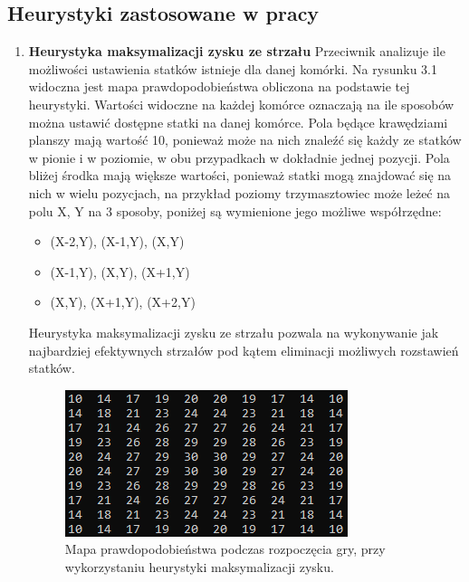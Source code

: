 \subsection{Heurystyki zastosowane w pracy}
\begin{enumerate}
  \item \textbf{Heurystyka maksymalizacji zysku ze strzału} Przeciwnik analizuje ile możliwości ustawienia statków istnieje dla danej komórki. Na rysunku 3.1 widoczna jest mapa prawdopodobieństwa obliczona na podstawie tej heurystyki. Wartości widoczne na każdej komórce oznaczają na ile sposobów można ustawić dostępne statki na danej komórce.  Pola będące krawędziami planszy mają wartość 10, ponieważ może na nich znaleźć się każdy ze statków w pionie i w poziomie, w obu przypadkach w dokładnie jednej pozycji. Pola bliżej środka mają większe wartości, ponieważ statki mogą znajdować się na nich w wielu pozycjach, na przykład poziomy trzymasztowiec może leżeć na polu X, Y na 3 sposoby, poniżej są wymienione jego możliwe współrzędne:
  \begin{itemize}
      \item (X-2,Y), (X-1,Y), (X,Y)
      \item (X-1,Y), (X,Y), (X+1,Y)
      \item (X,Y), (X+1,Y), (X+2,Y)
  \end{itemize}

  Heurystyka maksymalizacji zysku ze strzału pozwala na wykonywanie jak najbardziej efektywnych strzałów pod kątem eliminacji możliwych rozstawień statków.
  
  
  \begin{figure}[!h]
    \label{fig:mapa-prawdopodobienstwa-heurystyka-max-zysku}
    \centering \includegraphics[width=0.5\linewidth]{img/probabilityMapStart.PNG}
    \caption{Mapa prawdopodobieństwa podczas rozpoczęcia gry, przy wykorzystaniu heurystyki maksymalizacji zysku.}
\end{figure}
  

\end{enumerate}
